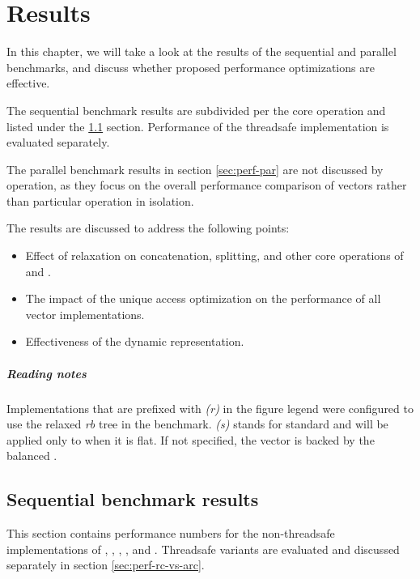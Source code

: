 \newcommand{\balanced}{}
\newcommand{\standard}{\emph{(s)}}
\newcommand{\relaxed}{\emph{(r)}}

\chapter{Results}
In this chapter, we will take a look at the results of the sequential and parallel benchmarks, and discuss whether proposed performance optimizations are effective.

The sequential benchmark results are subdivided per the core operation and listed under the \ref{sec:perf-seq} section. Performance of the threadsafe implementation is evaluated separately.

The parallel benchmark results in section \ref{sec:perf-par} are not discussed by operation, as they focus on the overall performance comparison of vectors rather than particular operation in isolation.

The results are discussed to address the following points:
\begin{itemize}
    \item Effect of \rrbtree{} relaxation on concatenation, splitting, and other core operations of \rrbvec{} and \pvec{}.
    \item The impact of the unique access optimization on the performance of all vector implementations.
    \item Effectiveness of the dynamic representation.
\end{itemize}

\paragraph{Reading notes}
Implementations that are prefixed with \relaxed{} in the figure legend were configured to use the relaxed \emph{rb} tree in the benchmark. \standard{} stands for standard and will be applied only to \pvec{} when it is flat. If not specified, the vector is backed by the balanced \rbtree{}.

\section{Sequential benchmark results}
\label{sec:perf-seq}
This section contains performance numbers for the non-threadsafe implementations of \stdvec{}, \rbvec{}, \rrbvec{}, \pvec{}, and \imrsvec{}. Threadsafe variants are evaluated and discussed separately in section \ref{sec:perf-rc-vs-arc}.

